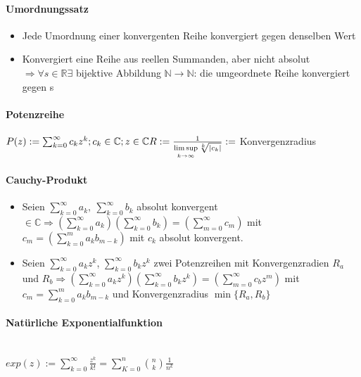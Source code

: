 \documentclass[paper=a3,paper=landscape, fontsize=9pt,DIV=25]{scrartcl}
\newcommand{\real}{{\mathbb{R}}}
\newcommand{\compl}{\mathbb{C}}
\newcommand{\nat}{\mathbb{N}}
\begin{document}
\begin{multicols*}{4}
  \paragraph{Umordnungssatz}\begin{itemize}
  \item Jede Umordnung einer konvergenten Reihe konvergiert gegen denselben Wert
  \item Konvergiert eine Reihe aus reellen Summanden, aber nicht absolut $\Rightarrow \forall s \in \real \exists$ bijektive Abbildung $\nat \rightarrow \nat$: die umgeordnete Reihe konvergiert gegen s
\end{itemize}

  \paragraph{Potenzreihe}
    $ P(z) := \sum_{k=0}^{\infty} c_kz^k; c_k \in \compl; z \in \compl\\R := \frac{1}{\limsup\limits_{k \rightarrow \infty} \sqrt[k]{|c_k|}} :=$ Konvergenzradius

  \paragraph{Cauchy-Produkt}
  \begin{itemize}
  \item Seien $ \sum_{k=0}^{\infty} a_k,\:\sum_{k=0}^{\infty} b_k$ absolut konvergent $ \in \compl \Rightarrow (\sum_{k=0}^{\infty} a_k) (\sum_{k=0}^{\infty} b_k) = (\sum_{m=0}^{\infty} c_m)$ mit $ c_m=(\sum_{k=0}^{m} a_kb_{m-k})$ mit $c_k$ absolut konvergent.
  
  \item Seien $ \sum_{k=0}^{\infty} a_kz^k$, $\sum_{k=0}^{\infty} b_kz^k$ zwei Potenzreihen mit Konvergenzradien $R_a$ und $ R_b \Rightarrow (\sum_{k=0}^{\infty} a_kz^k)(\sum_{k=0}^{\infty} b_kz^k)=(\sum_{m=0}^{\infty} c_bz^m)$ mit $ c_m = \sum_{k=0}^{m} a_kb_{m-k}$ und Konvergenzradius $\min\{R_a,R_b\}$
  \end{itemize}


  \paragraph{Natürliche Exponentialfunktion}\hspace{0pt} \\
  $ exp(z) := \sum_{k=0}^{\infty} \frac{z^k}{k!} = \sum_{K=0}^{n}\binom{n}{k}\frac{1}{n^k}$



\end{multicols*}
\end{document}

